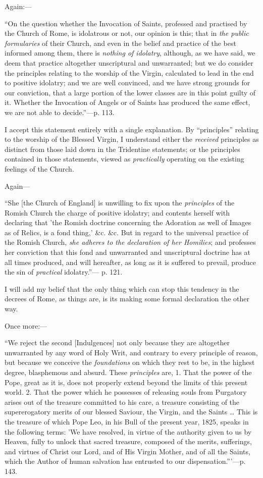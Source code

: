 Again:—

``On
the question whether the Invocation of Saints, professed and practised
by the Church of Rome, is idolatrous or not, our opinion is this; that
in \emph{the public formularies} of their Church, and even in the
belief and practice of the best informed among them, there is \emph{nothing
of idolatry}, although, as we have said, we deem that practice
altogether unscriptural and unwarranted; but we do consider the
principles relating to the worship of the Virgin, calculated to lead
in the end to positive idolatry; and we are well convinced, and we
have strong grounds for our conviction, that a large portion of the
lower classes are in this point guilty of it. Whether the Invocation
of Angels or of Saints has produced the same effect, we are not able
to decide.''—p. 113.

I accept this statement entirely with a single
explanation. By ``principles'' relating to the worship of the Blessed
Virgin, I understand either the \emph{received} principles as distinct
from those laid down in the Tridentine statements; or the principles
contained in those statements, viewed as \emph{practically} operating
on the existing feelings of the Church.

Again—

``She
[the Church of England] is unwilling to fix upon the \emph{principles}
of the Romish Church the charge of positive idolatry; and contents
herself with declaring that 'the Romish doctrine concerning the
Adoration as well of Images as of Relics, is a fond thing,' \&c.
\&c. But in regard to the universal practice of the Romish Church, \emph{she
adheres to the declaration of her Homilies}; and professes her
conviction that this fond and unwarranted and unscriptural doctrine
has at all times produced, and will hereafter, as long as it is
suffered to prevail, produce the sin of \emph{practical} idolatry.''—
p. 121.

I will add my belief that the only thing which
can stop this tendency in the decrees of Rome, as things are, is its
making some formal declaration the other way.

Once more:—

``We
reject the second [Indulgences] not only because they are altogether unwarranted by any word of Holy Writ, and contrary to every
principle of reason, but because we conceive the \emph{foundations} on
which they rest to be, in the highest degree, blasphemous and absurd.
These \emph{principles} are, 1. That the power of the Pope, great as
it is, does not properly extend beyond the limits of this present
world. 2. That the power which he possesses of releasing souls from
Purgatory arises out of the treasure committed to his care, a treasure
consisting of the supererogatory merits of our blessed Saviour, the
Virgin, and the Saints … This is the treasure of which Pope Leo, in
his Bull of the present year, 1825, speaks in the following terms: 'We
have resolved, in virtue of the authority given to us by Heaven, fully
to unlock that sacred treasure, composed of the merits, sufferings,
and virtues of Christ our Lord, and of His Virgin Mother, and of all
the Saints, which the Author of human salvation has entrusted to our
dispensation.'''—p. 143.

